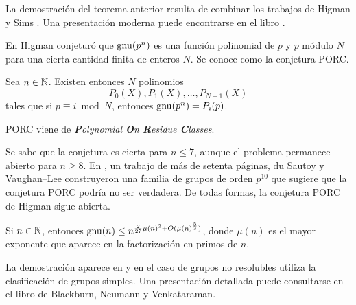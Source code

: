 La demostración del teorema anterior resulta de combinar los trabajos de Higman \cite{MR113948} 
y Sims \cite{MR169921}. Una presentación moderna puede encontrarse en el libro
\cite{MR2382539}. 

En \cite{MR123605} Higman conjeturó 
que $\operatorname{gnu}(p^n)$ es una función polinomial de $p$ y $p$ módulo $N$ para una cierta
cantidad finita de enteros $N$. Se conoce como la conjetura PORC.

\begin{conjecture}[Higman]
Sea $n\in\mathbb{N}$. Existen entonces $N$ polinomios 
\[
P_{0}(X),P_{1}(X),\dots,P_{N-1}(X)
\]
tales que
si $p\equiv i\bmod N$, entonces $\operatorname{gnu}(p^n)=P_{i}(p)$. 
\end{conjecture}

PORC viene de \emph{\textbf{P}olynomial \textbf{O}n \textbf{R}esidue \textbf{C}lasses}. 

Se sabe que la conjetura es cierta para $n\leq7$, aunque el problema permanece abierto para $n\geq8$. 
En \cite{MR2921623}, un trabajo de más de setenta páginas, 
du Sautoy y Vaughan--Lee construyeron una familia de grupos
de orden $p^{10}$ que sugiere que la conjetura PORC podría no ser verdadera. De todas formas, la conjetura
PORC de Higman sigue abierta. 

\begin{theorem}[Pyber]
Si $n\in\mathbb{N}$, entonces 
$\operatorname{gnu}(n)\leq n^{\frac{2}{27}\mu(n)^2+O(\mu(n)^{\frac{5}{3}})}$, donde $\mu(n)$ es el mayor exponente
que aparece en la factorización en primos de $n$. 
\end{theorem}

La demostración aparece en \cite{MR1200081} y en el caso de grupos no resolubles utiliza la clasificación de grupos simples. Una presentación detallada puede consultarse en el libro 
\cite{MR2382539} de Blackburn, Neumann y Venkataraman.

